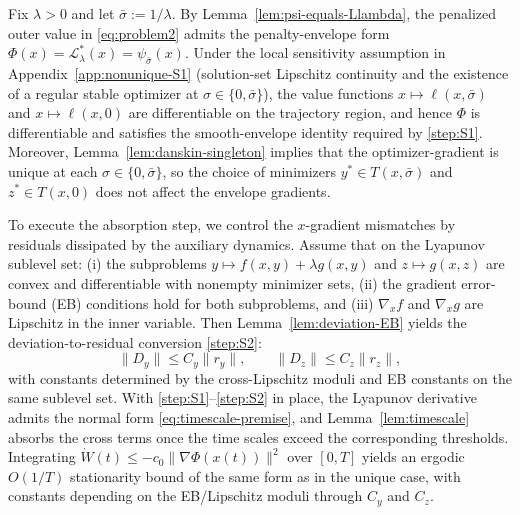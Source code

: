 \documentclass{article}
\newcommand{\1}{\mathbf{1}}
\begin{document}
Fix $\lambda>0$ and let $\bar\sigma:=1/\lambda$.
By Lemma~\ref{lem:psi-equals-Llambda}, the penalized outer value in \ref{eq:problem2} admits the penalty-envelope form
$\Phi(x)=\mathcal L_\lambda^*(x)=\psi_{\bar\sigma}(x)$.
Under the local sensitivity assumption in Appendix~\ref{app:nonunique-S1}
(solution-set Lipschitz continuity and the existence of a regular stable optimizer at $\sigma\in\{0,\bar\sigma\}$),
the value functions $x\mapsto \ell(x,\bar\sigma)$ and $x\mapsto \ell(x,0)$ are differentiable on the trajectory region,
and hence $\Phi$ is differentiable and satisfies the smooth-envelope identity required by \ref{step:S1}.
Moreover, Lemma~\ref{lem:danskin-singleton} implies that the optimizer-gradient is unique at each $\sigma\in\{0,\bar\sigma\}$,
so the choice of minimizers $y^*\in T(x,\bar\sigma)$ and $z^*\in T(x,0)$ does not affect the envelope gradients.

To execute the absorption step, we control the $x$-gradient mismatches by residuals dissipated by the auxiliary dynamics.
Assume that on the Lyapunov sublevel set: (i) the subproblems $y\mapsto f(x,y)+\lambda g(x,y)$ and $z\mapsto g(x,z)$
are convex and differentiable with nonempty minimizer sets, (ii) the gradient error-bound (EB) conditions hold for both subproblems,
and (iii) $\nabla_x f$ and $\nabla_x g$ are Lipschitz in the inner variable.
Then Lemma~\ref{lem:deviation-EB} yields the deviation-to-residual conversion \ref{step:S2}:
\[
\|D_y\|\le C_y\|r_y\|,
\qquad
\|D_z\|\le C_z\|r_z\|,
\]
with constants determined by the cross-Lipschitz moduli and EB constants on the same sublevel set.
With \ref{step:S1}--\ref{step:S2} in place, the Lyapunov derivative admits the normal form
\eqref{eq:timescale-premise}, and Lemma~\ref{lem:timescale} absorbs the cross terms once the time scales exceed the
corresponding thresholds. Integrating $\dot W(t)\le -c_0\|\nabla \Phi(x(t))\|^2$ over $[0,T]$ yields an ergodic $O(1/T)$ stationarity bound of the same form as in the unique case, with constants depending on the EB/Lipschitz moduli through $C_y$ and $C_z$.
\end{document}
